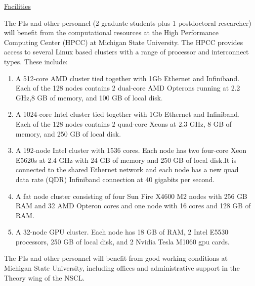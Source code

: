 \documentclass[11pt]{article}
\begin{document}
\centerline{\underline{\Large{Facilities}}} 
\medskip
\medskip
The PIs and other personnel (2 graduate students plus 1 postdoctoral researcher) will benefit from the computational resources at the High Performance Computing Center (HPCC) at Michigan State University. The HPCC provides access to several Linux based clusters with a range of processor and interconnect types. These include:

\begin{enumerate}
\item A 512-core AMD cluster tied together with 1Gb Ethernet and Infiniband. Each of the 128 nodes contains 2 dual-core AMD Opterons running at 2.2 GHz,8 GB of memory, and 100 GB of local disk.
\item A 1024-core Intel cluster tied together with 1Gb Ethernet and Infiniband. Each of the 128  nodes contains 2 quad-core Xeons at 2.3 GHz, 8 GB of memory, and 250 GB of local disk. 

\item A 192-node Intel cluster with 1536 cores. Each node has two four-core Xeon E5620s at 2.4 GHz with 24 GB of memory and 250 GB of local disk.It is connected to the shared Ethernet network and each node has a new quad data rate (QDR) Infiniband connection at 40 gigabits per second.

\item A fat node cluster consisting of four Sun Fire X4600 M2 nodes with 256 GB RAM and 32 AMD Opteron cores and one node with 16 cores and 128 GB of RAM. 

\item  A 32-node GPU cluster. Each node has 18 GB of RAM, 2 Intel E5530 processors, 250 GB of local disk, and 2 Nvidia Tesla M1060 gpu cards. 

\end{enumerate}

The PIs and other personnel will benefit from good working conditions at Michigan State University, including offices and administrative support in the Theory wing of the NSCL.
\end{document}
